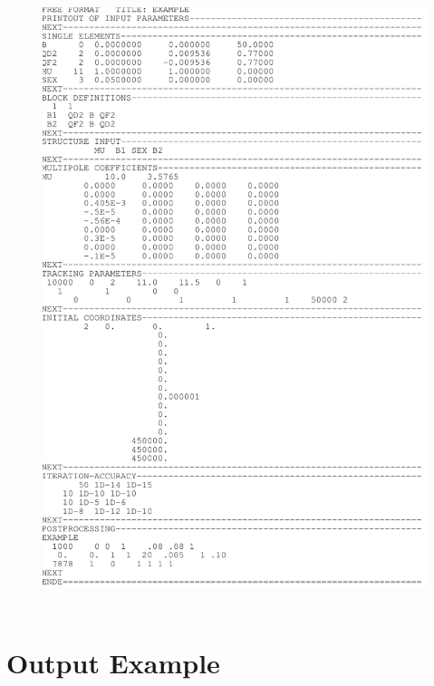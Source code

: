 \documentclass[a4paper,11pt]{report}
\begin{document}
\begin{figure}[H]
\begin{center}
  \includegraphics[width=16cm,height=18cm]{expout1}
\end{center}
\end{figure}

\clearpage

\section{Output Example} \label{output}
\end{document}
